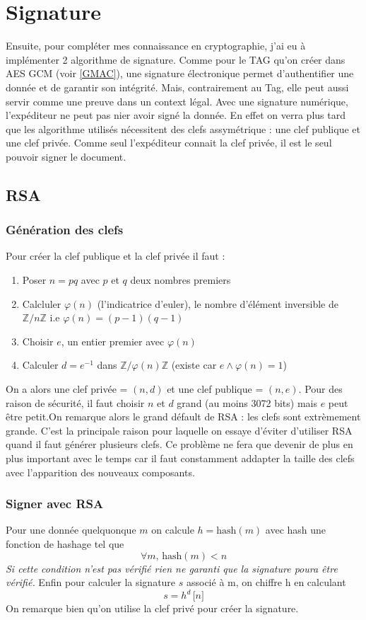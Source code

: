 \documentclass[a4paper, 12pt]{article}
\begin{document}
\section{Signature}
Ensuite, pour compléter mes connaissance en cryptographie, j'ai eu à implémenter 2 algorithme de signature. Comme pour le TAG qu'on créer dans AES GCM (voir \ref{GMAC}), une signature électronique permet d'authentifier une donnée et de garantir son intégrité. Mais, contrairement au Tag, elle peut aussi servir comme une preuve dans un context légal. Avec une signature numérique, l'expéditeur ne peut pas nier avoir signé la donnée. En effet on verra plus tard que les algorithme utilisés nécessitent des clefs assymétrique : une clef publique et une clef privée. Comme seul l'expéditeur connait la clef privée, il est le seul  pouvoir signer le document.

\subsection{RSA}
\subsubsection{Génération des clefs}
\noindent Pour créer la clef publique et la clef privée il faut :
\begin{enumerate}
	\item Poser $n = pq$ avec $p$ et $q$ deux nombres premiers
	\item Calcluler $\varphi(n)$ (l'indicatrice d'euler), le nombre d'élément inversible de $\mathbb{Z}/n\mathbb{Z}$ i.e $\varphi\left( n\right) = (p-1)(q-1)$
	\item Choisir $e$, un entier premier avec $\varphi(n)$
	\item Calculer $d = e^{-1}$ dans $\mathbb{Z}/\varphi(n)\mathbb{Z}$ (existe car $e \wedge \varphi(n) = 1$) 
\end{enumerate}
On a alors une clef privée = $(n, d)$ et une clef publique = $(n,e)$. Pour des raison de sécurité, il faut choisir $n$ et $d$ grand (au moins 3072 bits) mais $e$ peut être petit.On remarque alors le grand défault de RSA :  les clefs sont extrèmement grande. C'est la principale raison pour laquelle on essaye d'éviter d'utiliser RSA quand il faut générer plusieurs clefs. Ce problème ne fera que devenir de plus en plus important avec le temps car il faut constamment addapter la taille des clefs avec l'apparition des nouveaux composants.

\subsubsection{Signer avec RSA}
Pour une donnée quelquonque $m$ on calcule $h = \text{hash}(m)$ avec hash une fonction de hashage tel que 
$$
\forall m, \, \text{hash}(m) < n
$$ 
\emph{Si cette condition n'est pas vérifié rien ne garanti que la signature poura être vérifié.}
Enfin pour calculer la signature $s$ associé à m, on chiffre h en calculant 
$$
s = h^d \, \lbrack n \rbrack
$$
On remarque bien qu'on utilise la clef privé pour créer la signature.
\end{document}
